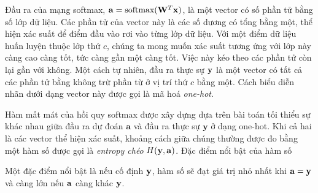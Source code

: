\def\softmax{\text{softmax}}
Đầu ra của mạng softmax, $\ba = \softmax(\bW^T\bx)$, là một vector có số phần tử bằng số lớp dữ liệu. Các phần tử của vector này là các số dương có tổng bằng một, thể hiện xác suất để điểm đầu vào rơi vào từng lớp dữ liệu. Với một điểm dữ liệu huấn luyện thuộc lớp thứ $c$, chúng ta mong muốn xác suất tương ứng với lớp này càng cao càng tốt, tức càng gần một càng tốt. Việc này kéo theo các phần tử còn lại gần với không. Một cách tự nhiên, đầu ra thực sự $\mathbf{y}$ là một vector có tất cả các phần tử bằng không trừ phần từ ở vị trí thứ $c$ bằng một. Cách biểu diễn nhãn dưới dạng vector này được gọi là mã hoá \textit{one-hot}.


Hàm mất mát của hồi quy softmax được xây dựng dựa trên bài toán tối thiểu sự
khác nhau giữa {đầu ra dự đoán} $\mathbf{a}$ và {đầu ra thực sự}
$\mathbf{y}$ ở dạng one-hot. Khi cả hai là các vector thể hiện xác suất,
khoảng cách giữa chúng thường được đo bằng một hàm số được gọi là
\textit{entropy chéo} $H(\mathbf{y}, \mathbf{a})$. Đặc điểm nổi bật của hàm số

Một đặc điểm nổi bật là nếu cố định $\mathbf{y}$, hàm số sẽ đạt giá trị nhỏ nhất khi $\mathbf{a} = \mathbf{y}$ và càng lớn nếu $\mathbf{a}$ càng khác $\mathbf{y}$.



